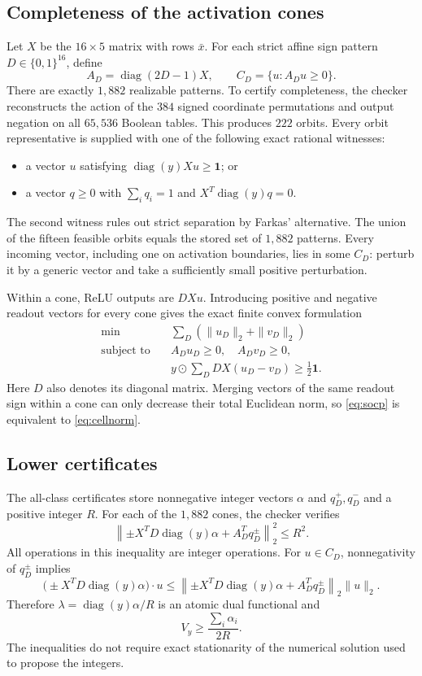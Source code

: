\documentclass[11pt]{article}
\theoremstyle{remark}\newtheorem{remark}[theorem]{Remark}
\newcommand{\1}{\mathbf 1}
\begin{document}
\subsection{Completeness of the activation cones}
Let $X$ be the $16\times5$ matrix with rows $\bar x$. For each strict affine sign pattern $D\in\{0,1\}^{16}$, define
\[
A_D=\operatorname{diag}(2D-1)X,
\qquad C_D=\{u:A_Du\ge0\}.
\]
There are exactly $1{,}882$ realizable patterns. To certify completeness, the checker reconstructs the action of the $384$ signed coordinate permutations and output negation on all $65{,}536$ Boolean tables. This produces $222$ orbits. Every orbit representative is supplied with one of the following exact rational witnesses:
\begin{itemize}[itemsep=2pt]
\item a vector $u$ satisfying $\operatorname{diag}(y)Xu\ge\1$; or
\item a vector $q\ge0$ with $\sum_iq_i=1$ and $X^T\operatorname{diag}(y)q=0$.
\end{itemize}
The second witness rules out strict separation by Farkas' alternative. The union of the fifteen feasible orbits equals the stored set of $1{,}882$ patterns. Every incoming vector, including one on activation boundaries, lies in some $C_D$: perturb it by a generic vector and take a sufficiently small positive perturbation.

Within a cone, ReLU outputs are $DXu$. Introducing positive and negative readout vectors for every cone gives the exact finite convex formulation
\[
\begin{aligned}
\min\quad&\sum_D(\|u_D\|_2+\|v_D\|_2)\\
\text{subject to}\quad&A_Du_D\ge0,\quad A_Dv_D\ge0,\\
&y\odot\sum_DD X(u_D-v_D)\ge\tfrac12\1.
\end{aligned}
\tag{13}\label{eq:socp}
\]
Here $D$ also denotes its diagonal matrix. Merging vectors of the same readout sign within a cone can only decrease their total Euclidean norm, so \eqref{eq:socp} is equivalent to \eqref{eq:cellnorm}.

\subsection{Lower certificates}
The all-class certificates store nonnegative integer vectors $\alpha$ and $q_D^+,q_D^-$ and a positive integer $R$. For each of the $1{,}882$ cones, the checker verifies
\[
\left\|\pm X^TD\operatorname{diag}(y)\alpha+A_D^Tq_D^\pm\right\|_2^2\le R^2.
\tag{14}\label{eq:integerdual}
\]
All operations in this inequality are integer operations. For $u\in C_D$, nonnegativity of $q_D^\pm$ implies
\[
\big(\pm X^TD\operatorname{diag}(y)\alpha\big)\cdot u
\le\left\|\pm X^TD\operatorname{diag}(y)\alpha+A_D^Tq_D^\pm\right\|_2\|u\|_2.
\]
Therefore $\lambda=\operatorname{diag}(y)\alpha/R$ is an atomic dual functional and
\[
V_y\ge\frac{\sum_i\alpha_i}{2R}.
\tag{15}\label{eq:lower}
\]
The inequalities do not require exact stationarity of the numerical solution used to propose the integers.
\end{document}

